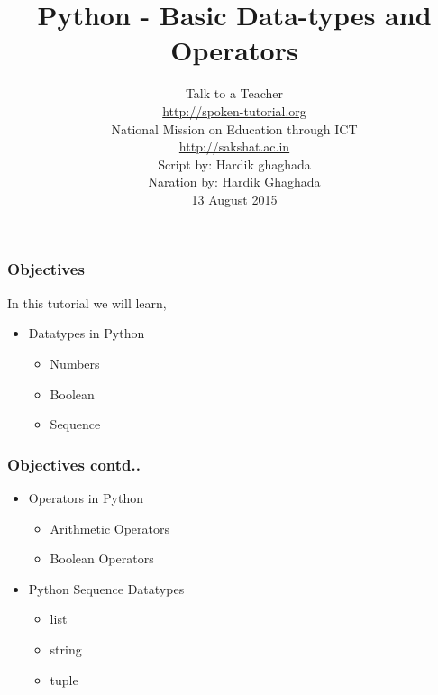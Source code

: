 \documentclass[17pt,compress]{beamer}
\author[FOSSEE]{}
\institute[IIT Bombay]{}
\date[]{}
\begin{document}
\sffamily \bfseries
\title
[Basic Data-types and Operators]
{Python - Basic Data-types and Operators}
\author
[FOSSEE, IIT - Bombay]
{\small Talk to a Teacher\\{\color{blue}\url{http://spoken-tutorial.org}}\\National Mission on Education
 through ICT\\{\color{blue}\url{http://sakshat.ac.in}} \\[0.5cm]{\tiny Script by: Hardik ghaghada \\ Naration by: Hardik Ghaghada \\ 13 August 2015}}

\begin{frame}
   \titlepage
\end{frame}
\begin{frame}
\frametitle{Objectives}
\label{sec-2}

  In this tutorial we will learn, \pause
\begin{itemize}

\item Datatypes in Python\pause
\label{sec-2_1}%
	\begin{itemize}
	\item Numbers\\
	\label{sec-2_1_1}%
	\item Boolean\\
	\label{sec-2_1_2}%
	\item Sequence\\
	\end{itemize} %
\end{itemize} %
\end{frame}
\begin{frame}
\frametitle{Objectives contd..}
\label{sec-2}

\begin{itemize}

\item Operators in Python\pause
\label{sec-2_2}%
\begin{itemize}

\item Arithmetic Operators\\
\label{sec-2_2_1}%
\item Boolean Operators\\\pause
\label{sec-2_2_2}%
\end{itemize} %

\item Python Sequence Datatypes\pause
\label{sec-2_3}%
\begin{itemize}

\item list
\label{sec-2_3_1}%
\item string
\label{sec-2_3_2}%
\item tuple
\label{sec-2_3_3}%
\end{itemize} %
\end{itemize} %
\end{frame}
\end{document}

